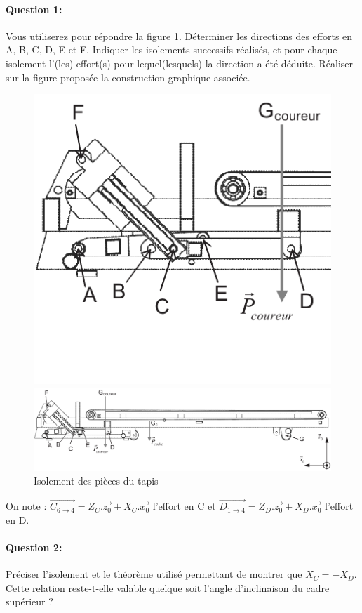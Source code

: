 \paragraph{Question 1:} Vous utiliserez pour répondre la figure \ref{img45}. Déterminer les directions des efforts en A, B, C, D, E et F. Indiquer les isolements successifs réalisés, et pour chaque isolement l'(les) effort(s) pour lequel(lesquels) la direction a été déduite. Réaliser sur la figure proposée la construction graphique associée.

\begin{figure}[!h]
    \centering\includegraphics[width=0.5\linewidth]{img/isolement_2.png}

\vspace{1cm}
 
   \centering\includegraphics[width=0.8\linewidth]{img/isolement.png}

 \vspace{-1.5cm}
    \caption{Isolement des pièces du tapis}
  \label{img45}
\end{figure}

On note : $\overrightarrow{C_{6 \rightarrow 4}}=Z_C.\overrightarrow{z_0}+X_C.\overrightarrow{x_0}$ l'effort en C et $\overrightarrow{D_{1 \rightarrow 4}}=Z_D.\overrightarrow{z_0}+X_D.\overrightarrow{x_0}$ l'effort en D.

\paragraph{Question 2:} Préciser l'isolement et le théorème utilisé permettant de montrer que $X_C=-X_D$. Cette relation reste-t-elle valable quelque soit l'angle d'inclinaison du cadre supérieur ?

